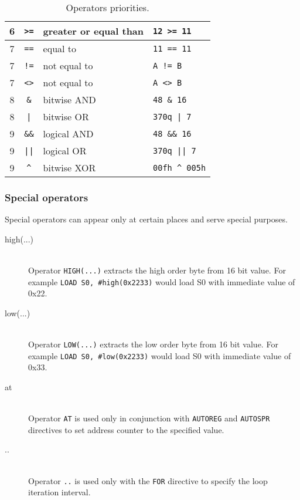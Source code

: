 \begin{table}[h!]
\begin{tabular}{|c|c|l|l|}
                6        & \texttt{>=}   & greater or equal than   & \texttt{12 >= 11}          \\\hline
                7        & \texttt{==}   & equal to                & \texttt{11 == 11}          \\\hline
                7        & \texttt{!=}   & not equal to            & \texttt{A != B}           \\\hline
                7        & \texttt{<>}   & not equal to            & \texttt{A <> B}           \\\hline
                8        & \texttt{\&}   & bitwise AND             & \texttt{48 \& 16}          \\\hline
                8        & \texttt{|}    & bitwise OR              & \texttt{370q | 7}          \\\hline
                9        & \texttt{\&\&} & logical AND             & \texttt{48 \&\& 16}        \\\hline
                9        & \texttt{||}   & logical OR              & \texttt{370q || 7}         \\\hline
                9        & \texttt{\^{}} & bitwise XOR             & \texttt{00fh \^{} 005h}    \\\hline
            \end{tabular}
            \caption{Operators priorities.}
        \end{table}

        \subsubsection{Special operators}
            Special operators can appear only at certain places and serve special purposes.
            \begin{description}
                \item[high(...)]~\\
                    Operator \texttt{HIGH(...)} extracts the high order byte from 16 bit value. For example \texttt{LOAD  S0, \#high(0x2233)} would load S0 with immediate value of 0x22.
                \item[low(...)]~\\
                    Operator \texttt{LOW(...)} extracts the low order byte from 16 bit value. For example \texttt{LOAD  S0, \#low(0x2233)} would load S0 with immediate value of 0x33.
                \item[at]~\\
                    Operator \texttt{AT} is used only in conjunction with \texttt{AUTOREG} and \texttt{AUTOSPR} directives to set address counter to the specified value.
                \item[..]~\\
                    Operator \texttt{..} is used only with the \texttt{FOR} directive to specify the loop iteration interval.
            \end{description}

